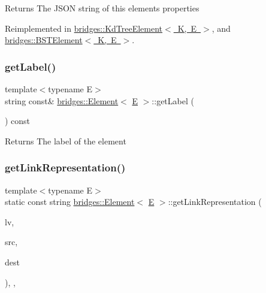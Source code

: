 \begin{DoxyReturn}{Returns}
The J\+S\+ON string of this element\textquotesingle{}s properties 
\end{DoxyReturn}


Reimplemented in \mbox{\hyperlink{classbridges_1_1_kd_tree_element_ad8aa2d89689f33691063fee9c601e2cb}{bridges\+::\+Kd\+Tree\+Element$<$ K, E $>$}}, and \mbox{\hyperlink{classbridges_1_1_b_s_t_element_a623d1495a0d27090dc3fc515d148f381}{bridges\+::\+B\+S\+T\+Element$<$ K, E $>$}}.

\mbox{\label{classbridges_1_1_element_a4a837ef776c2fd3ecf6587f6e3136351}} 
\subsubsection{\texorpdfstring{getLabel()}{getLabel()}}
{\footnotesize\ttfamily template$<$typename E$>$ \\
string const\& \mbox{\hyperlink{classbridges_1_1_element}{bridges\+::\+Element}}$<$ \mbox{\hyperlink{namespacebridges_acfb0a4f7877d8f63de3e6862004c50eda3a3ea00cfc35332cedf6e5e9a32e94da}{E}} $>$\+::get\+Label (\begin{DoxyParamCaption}{ }\end{DoxyParamCaption}) const\hspace{0.3cm}{\ttfamily [inline]}}

\begin{DoxyReturn}{Returns}
The label of the element 
\end{DoxyReturn}
\mbox{\label{classbridges_1_1_element_ac6fa7b04e28a1e9b8d8f2d395dd6e2c1}} 
\subsubsection{\texorpdfstring{getLinkRepresentation()}{getLinkRepresentation()}}
{\footnotesize\ttfamily template$<$typename E$>$ \\
static const string \mbox{\hyperlink{classbridges_1_1_element}{bridges\+::\+Element}}$<$ \mbox{\hyperlink{namespacebridges_acfb0a4f7877d8f63de3e6862004c50eda3a3ea00cfc35332cedf6e5e9a32e94da}{E}} $>$\+::get\+Link\+Representation (\begin{DoxyParamCaption}\item[{const \mbox{\hyperlink{classbridges_1_1_link_visualizer}{Link\+Visualizer}} \&}]{lv,  }\item[{const string \&}]{src,  }\item[{const string \&}]{dest }\end{DoxyParamCaption})\hspace{0.3cm}{\ttfamily [inline]}, {\ttfamily [static]}, {\ttfamily [protected]}}

